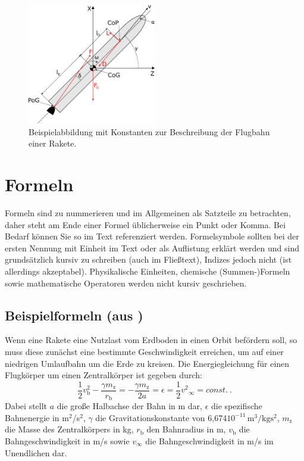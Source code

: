 \begin{figure}[hbt!]
	\centering
	\includegraphics[width=0.5\textwidth]{abbildungen/koordinaten.pdf}
	\caption{Beispielabbildung mit Konstanten zur Beschreibung der Flugbahn einer Rakete.}
	\label{fig:flugbahn}
\end{figure}

\section{Formeln}
\label{subsec:formeln}
Formeln sind zu nummerieren und im Allgemeinen als Satzteile zu betrachten, daher steht am Ende einer Formel üblicherweise ein Punkt oder Komma. Bei Bedarf können Sie so im Text referenziert werden. Formelsymbole sollten bei der ersten Nennung mit Einheit im Text oder als Auflistung erklärt werden und sind grundsätzlich kursiv zu schreiben (auch im Fließtext), Indizes jedoch nicht (ist allerdings akzeptabel). Physikalische Einheiten, chemische (Summen-)Formeln sowie mathematische Operatoren werden nicht kursiv geschrieben.

\subsection[Beispielformeln]{Beispielformeln (aus \cite{Fasoulas2017})}
\label{subsec:beispielformeln}
Wenn eine Rakete eine Nutzlast vom Erdboden in einen Orbit befördern soll, so muss diese zunächst eine bestimmte Geschwindigkeit erreichen, um auf einer niedrigen Umlaufbahn um die Erde zu kreisen.
Die Energiegleichung für einen Flugkörper um einen Zentralkörper ist gegeben durch:
\begin{equation}
	\frac{1}{2} v_{\textrm{b}}^2 - \frac{\gamma m_{\textrm{z}}}{r_{\textrm{b}}}= -\frac{\gamma   m_{\textrm{z}}}{2 a} = \epsilon = \frac{1}{2}   {v^2}_{\infty} = const. \ .
	\label{eq:energiegleichung}
\end{equation}
Dabei stellt $a$ die große Halbachse der Bahn in m dar, $\epsilon$ die spezifische Bahnenergie in m$^2$/s$^2$, $\gamma$ die Gravitationskonstante von 6,674$ 10^{-11}\,\mathrm{m^3/kgs^2}$, $m_{\textrm{z}}$ die Masse des Zentralkörpers in kg, $r_{\textrm{b}}$ den Bahnradius in m, $v_{\textrm{b}}$ die Bahngeschwindigkeit in m/s sowie $v_{\infty}$ die Bahngeschwindigkeit in m/s im Unendlichen dar.


